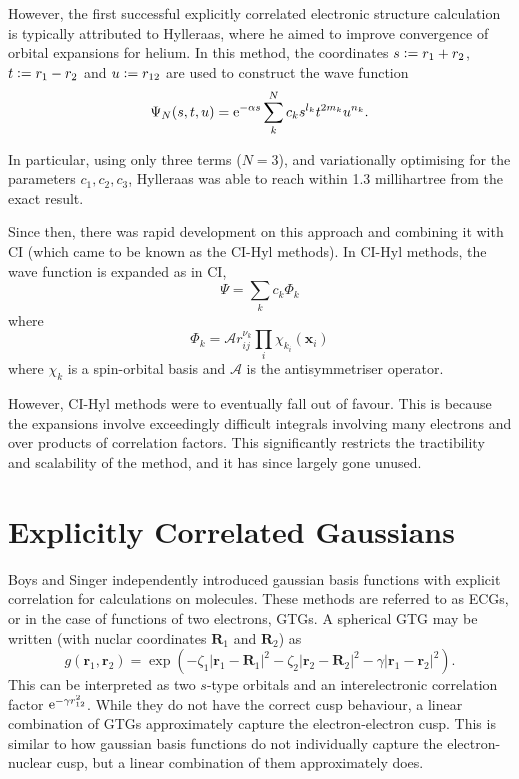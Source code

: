 However, the first successful explicitly correlated electronic structure calculation is typically attributed to Hylleraas,\cite{hattigExplicitly2011} where he aimed to improve convergence of orbital expansions for helium.\cite{hylleraasUeber1928,hylleraasNeue1929} In this method, the coordinates $s\mathrel{\mathop:}= r_1+r_2$, $t\mathrel{\mathop:}= r_1 - r_2$ and $u\mathrel{\mathop:}= r_{12}$ are used to construct the wave function
\begin{equation}
    \Psi_N(s,t,u) = \mathrm{e}^{-\alpha s}\sum_{k}^N c_ks^{l_k}t^{2m_k}u^{n_k}.
\end{equation}

In particular, using only three terms ($N=3$), and variationally optimising for the parameters $c_1,c_2,c_3$, Hylleraas was able to reach within 1.3 millihartree from the exact result.

Since then, there was rapid development on this approach and combining it with \gls{CI} (which came to be known as the CI-Hyl methods).
\cite{largo-cabrerizoHylleraasCI1987,jamesGround1933,kolosAccurate1964,perkinsAtomic1968,perkinsAtomic1969,simsCombined1971,simsOneCenter1971,claryHylleraastype1977,claryCIHylleraas1976} In CI-Hyl methods, the wave function is expanded as in \gls{CI},
\begin{equation}
    \Psi = \sum_k c_k \Phi_k
\end{equation}
where
\begin{equation}
    \Phi_k = \mathcal{A} r^{\nu_k}_{ij}\prod_i\chi_{k_i}(\bm x_i)
\end{equation}
where ${\chi_k}$ is a spin-orbital basis and $\mathcal{A}$ is the antisymmetriser operator.

However, CI-Hyl methods were to eventually fall out of favour. This is because the expansions involve exceedingly difficult integrals involving many electrons and over products of correlation factors. This significantly restricts the tractibility and scalability of the method, and it has since largely gone unused.

\section{Explicitly Correlated Gaussians}

Boys\cite{boysIntegral1960} and Singer\cite{singerUse1960} independently introduced gaussian basis functions with explicit correlation for calculations on molecules.\cite{mitroyTheory2013} These methods are referred to as \glspl{ECG}, or in the case of functions of two electrons, \glspl{GTG}. A spherical \gls{GTG} may be written (with nuclar coordinates $\bm R_1$ and $\bm R_2$) as
\begin{equation}
    g(\bm r_1, \bm r_2) = \exp(-\zeta_1|\bm r_1 - \bm R_1|^2 - \zeta_2|\bm r_2 - \bm R_2|^2 - \gamma|\bm r_1 - \bm r_2|^2).
\end{equation}
This can be interpreted as two $s$-type orbitals and an interelectronic correlation factor $\mathrm{e}^{-\gamma r_{12}^2}$.
While they do not have the correct cusp behaviour, a linear combination of \glspl{GTG} approximately capture the electron-electron cusp. This is similar to how gaussian basis functions do not individually capture the electron-nuclear cusp, but a linear combination of them approximately does.


